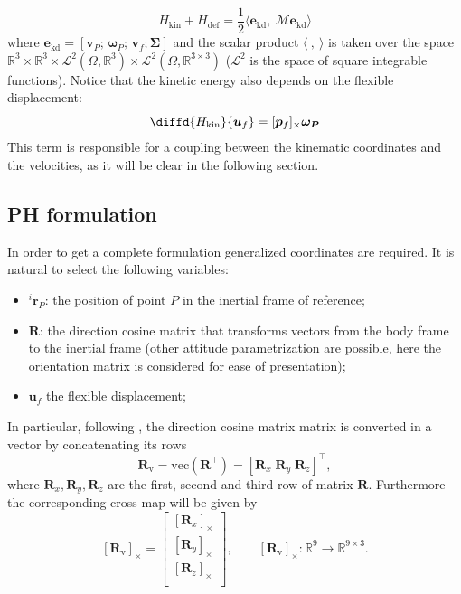 \documentclass{svjour3}                     %
\newcommand{\crmat}[1]{\ensuremath{[#1]_{\times}}}
\begin{document}
\begin{equation}
H_{\text{kin}} + H_{\text{def}} = \frac{1}{2} \langle \bm{e}_{\text{kd}}, \ \bm{\mathcal{M}} \bm{e}_{\text{kd}} \rangle
\end{equation}
where $\bm{e}_{\text{kd}} = [\bm{v}_P; \, \bm{\omega}_P; \, \bm{v}_f; \bm{\Sigma}]$ and the scalar product $\langle \ , \ \rangle$ is taken over the space $\mathbb{R}^3 \times \mathbb{R}^3 \times \mathscr{L}^2(\Omega, \mathbb{R}^3) \times \mathscr{L}^2(\Omega, \mathbb{R}^{3\times 3})$ ($\mathscr{L}^2$ is the space of square integrable functions). Notice that the kinetic energy also depends on the flexible displacement:
\[
\diffd{H_{\text{kin}}}{\bm{u}_f} = \crmat{\bm{p}_f} \bm{\omega_{P}}
\]
This term is responsible for a coupling between the kinematic coordinates and the velocities, as it will be clear in the following section. 

\subsection{PH formulation}
In order to get a complete formulation generalized coordinates are required. It is natural to select the following variables:
\begin{itemize}
	\item $^i \bm{r}_P$: the position of point $P$ in the inertial frame of reference;
	\item $\bm{R}$: the direction cosine matrix that transforms vectors from the body frame to the inertial frame (other attitude parametrization are possible, here the orientation matrix is considered for ease of presentation);
	\item $\bm{u}_f$ the flexible displacement;
\end{itemize}

In particular, following \cite{attitude_ph}, the direction cosine matrix matrix is converted in a vector by concatenating its rows
\begin{equation*}
\bm{R}_{\text{v}} = \text{vec}(\bm{R}^\top) = [\bm{R}_x \; \bm{R}_y \; \bm{R}_z]^\top,
\end{equation*}
where $\bm{R}_{x}, \bm{R}_{y}, \bm{R}_{z}$ are the first, second and third row of matrix $\bm{R}$. Furthermore the corresponding cross map will be given by
\begin{equation*}
\crmat{\bm{R}_{\text{v}}} = 
\begin{bmatrix}
\crmat{\bm{R}_x} \\
\crmat{\bm{R}_y} \\
\crmat{\bm{R}_z} \\
\end{bmatrix}, \qquad 
\crmat{\bm{R}_{\text{v}}} : \mathbb{R}^9 \rightarrow \mathbb{R}^{9 \times 3}.
\end{equation*}
\end{document}
